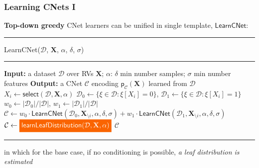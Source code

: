 \documentclass[xcolor={usenames,dvipsnames,svgnames}, compress]{beamer}
\newcommand{\highlight}[2][yellow]{\mathchoice%
  {\colorbox{#1}{\strut\textcolor{white}{$\displaystyle{#2}$}}}%
  {\colorbox{#1}{\strut\textcolor{white}{$\textstyle{#2}$}}}%
  {\colorbox{#1}{\strut\textcolor{white}{$\scriptstyle{#2}$}}}%
  {\colorbox{#1}{\strut\textcolor{white}{$\scriptscriptstyle{#2}$}}}}%
\begin{document}
\begin{frame}[t]
  \frametitle{Learning CNets I}
  \small
      \textbf{Top-down greedy} CNet learners %
    can be unified in single template, $\mathsf{LearnCNet}$:\vspace{-10pt}
 \begin{center}  
  \begin{minipage}{0.9\linewidth}
    \vspace{10pt}
        \scriptsize
        {\hrule\flushleft\textsf{LearnCNet}($\mathcal{D}$, $\mathbf{X}$, $\alpha$,
        $\delta$, $\sigma$)\\\hrule}
  \begin{algorithmic}[1]
    \State \textbf{Input:} a dataset $\mathcal{D}$ over RVs $\mathbf{X}$; $\alpha$: $\delta$
    min number samples; $\sigma$ min number features
    \State  \textbf{Output:}  a CNet $\mathcal{C}$ encoding  $\mathsf{p}_{\mathcal{C}}(\textbf{X})$ learned from $\mathcal D$
    \State $X_i\leftarrow  \mathsf{select}(\mathcal D, \mathbf X, \alpha)$
    \State $\mathcal D_0 \leftarrow \{\xi \in \mathcal D: \xi[X_i]=0 \}$, $\mathcal D_1 \leftarrow \{\xi \in \mathcal D: \xi[X_i]=1 \}$
    \State $w_0 \leftarrow |\mathcal D_0| / |\mathcal D|$, $w_1 \leftarrow |\mathcal   D_1| / |\mathcal D|$
    \State $\mathcal{C} \leftarrow
    w_0\cdot\mathsf{LearnCNet}(\mathcal D_0, \mathbf X_{\setminus i},
    \alpha, \delta, \sigma) + w_1 \cdot\mathsf{LearnCNet}(\mathcal D_1, \mathbf X_{\setminus i}, \alpha, \delta, \sigma) $
    \Else 
    \State $\mathcal{C} \leftarrow
    \highlight[gold4]{\mathsf{learnLeafDistribution}(\mathcal D,
      \mathbf X, \alpha)}$
    \EndIf
    \State \Return $\mathcal{C}$
  \end{algorithmic}
  \hrule
\end{minipage}
\end{center}
\vspace{10pt}
  \small
  in which for the base case, if no conditioning is possible, \emph{a leaf
  distribution is estimated}
\end{frame}
\end{document}
